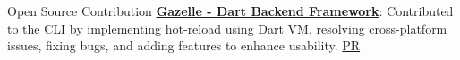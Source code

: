 \documentclass{resume}
\begin{document}

\begin{rSection}{Open Source Contribution}
    \textbf{\href{https://docs.gazelle-dart.dev/}{Gazelle - Dart Backend Framework}}: Contributed to the CLI by implementing hot-reload using Dart VM, resolving cross-platform issues, fixing bugs, and adding features to enhance usability. \hfill \href{https://github.com/intales/gazelle/commits?author=ShivanshuKGupta}{PR}
\end{rSection}

\end{document}
